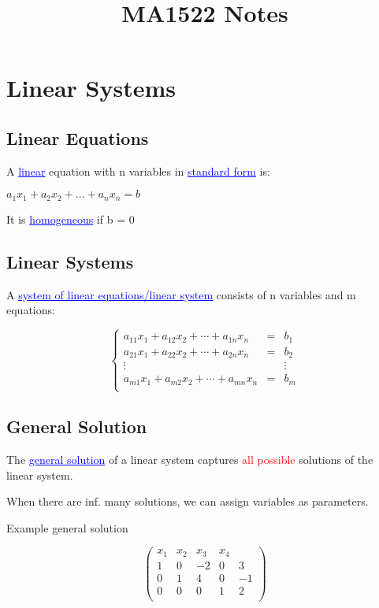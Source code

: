 \documentclass{article}
\title{MA1522 Notes}
\newcommand{\bul}[1]{\textcolor{blue}{\underline{#1}}}
\begin{document}
\section{Linear Systems}
\subsection{Linear Equations}
A \bul{linear} equation with n variables in \bul{standard form} is:
\begin{center}
    \begin{math}
        a_1x_1 + a_2x_2 + ... + a_nx_n = b
    \end{math}
\end{center}

It is \bul{homogeneous} if b = 0

\subsection{Linear Systems}
A \bul{system of linear equations/linear system} consists of n variables and m equations:

\[
\left\{
\begin{array}{lcl}
a_{11}x_1 + a_{12}x_2 + \cdots + a_{1n}x_n & = & b_1 \\
a_{21}x_1 + a_{22}x_2 + \cdots + a_{2n}x_n & = & b_2 \\
\vdots & & \vdots \\
a_{m1}x_1 + a_{m2}x_2 + \cdots + a_{mn}x_n & = & b_m \\
\end{array}
\right.
\]

\subsection{General Solution}
The \bul{general solution} of a linear system captures \textcolor{red}{all possible} solutions of the linear system.

When there are inf. many solutions, we can assign variables as parameters.

\vspace{10pt}

Example general solution


\[
\left( 
\begin{array}{cccc|c}
x_1 & x_2 & x_3 & x_4 & \\
\hline
1 & 0 & -2 & 0 & 3 \\
0 & 1 & 4 & 0 & -1 \\
0 & 0 & 0 & 1 & 2 \\
\end{array}
\right)
\]
\end{document}
